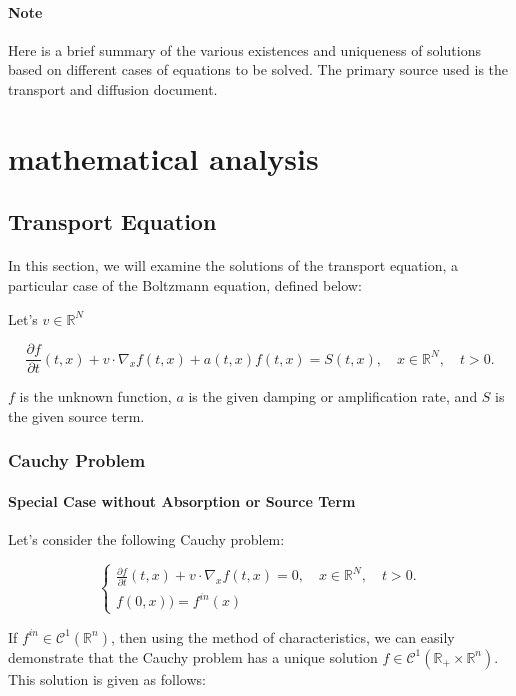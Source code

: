 \documentclass[a4paper, 11pt]{article}
\begin{document}
\paragraph{Note} Here is a brief summary of the various existences and uniqueness of solutions based on different cases of equations to be solved. The primary source used is the transport and diffusion document.
\section{mathematical analysis}

\subsection{Transport Equation}

\paragraph{}
In this section, we will examine the solutions of the transport equation, a particular case of the Boltzmann equation, defined below:



Let's $v \in \mathbb{R}^N$

\begin{equation} \label{transport}
	\frac{\partial f}{\partial t}(t,x)+v \cdot \nabla_x f(t,x) + a(t,x)f(t,x) = S(t,x), \quad x \in \mathbb{R}^N, \quad t>0.
\end{equation}


$f$ is the unknown function, $a$ is the given damping or amplification rate, and $S$ is the given source term.

\subsubsection{Cauchy Problem}
\paragraph{Special Case without Absorption or Source Term}

Let's consider the following Cauchy problem:

\[
\begin{cases}
	\frac{\partial f}{\partial t}(t,x)+v \cdot \nabla_x f(t,x)=0, \quad x \in \mathbb{R}^N, \quad t>0.\\
	f(0,x)) = f^{in}(x)
\end{cases}
\]

If $f^{in} \in \mathcal{C}^1(\mathbb{R}^n)$, then using the method of characteristics, we can easily demonstrate that the Cauchy problem has a unique solution $f \in \mathcal{C}^1(\mathbb{R}_+ \times \mathbb{R}^n)$. This solution is given as follows:
\end{document}
